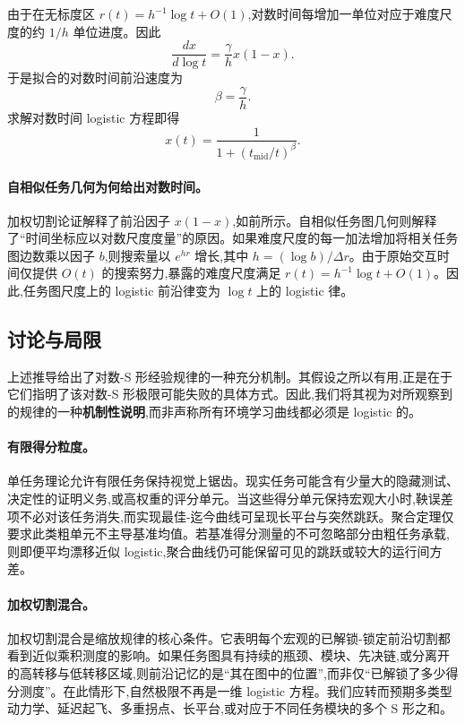 由于在无标度区 $r(t) = h^{-1} \log t + O(1)$,对数时间每增加一单位对应于难度尺度的约 $1/h$ 单位进度。因此
\[
    \frac{dx}{d \log t} = \frac{\gamma}{h} x(1 - x).
\]
于是拟合的对数时间前沿速度为
\[
    \beta = \frac{\gamma}{h}.
\]
求解对数时间 logistic 方程即得
\[
    x(t) = \frac{1}{1 + (t_{\mathrm{mid}} / t)^{\beta}}.
\]

\paragraph{自相似任务几何为何给出对数时间。} 加权切割论证解释了前沿因子 $x(1 - x)$,如前所示。自相似任务图几何则解释了``时间坐标应以对数尺度度量''的原因。如果难度尺度的每一加法增加将相关任务图边数乘以因子 $b$,则搜索量以 $e^{h r}$ 增长,其中 $h = (\log b) / \Delta r$。由于原始交互时间仅提供 $O(t)$ 的搜索努力,暴露的难度尺度满足 $r(t) = h^{-1} \log t + O(1)$。因此,任务图尺度上的 logistic 前沿律变为 $\log t$ 上的 logistic 律。

\subsection{讨论与局限}
\label{app:limit}

上述推导给出了对数-S 形经验规律的一种充分机制。其假设之所以有用,正是在于它们指明了该对数-S 形极限可能失败的具体方式。因此,我们将其视为对所观察到的规律的一种\textbf{机制性说明},而非声称所有环境学习曲线都必须是 logistic 的。

\paragraph{有限得分粒度。} 单任务理论允许有限任务保持视觉上锯齿。现实任务可能含有少量大的隐藏测试、决定性的证明义务,或高权重的评分单元。当这些得分单元保持宏观大小时,鞅误差项不必对该任务消失,而实现最佳-迄今曲线可呈现长平台与突然跳跃。聚合定理仅要求此类粗单元不主导基准均值。若基准得分测量的不可忽略部分由粗任务承载,则即便平均漂移近似 logistic,聚合曲线仍可能保留可见的跳跃或较大的运行间方差。

\paragraph{加权切割混合。} 加权切割混合是缩放规律的核心条件。它表明每个宏观的已解锁-锁定前沿切割都看到近似乘积测度的影响。如果任务图具有持续的瓶颈、模块、先决链,或分离开的高转移与低转移区域,则前沿记忆的是``其在图中的位置'',而非仅``已解锁了多少得分测度''。在此情形下,自然极限不再是一维 logistic 方程。我们应转而预期多类型动力学、延迟起飞、多重拐点、长平台,或对应于不同任务模块的多个 S 形之和。

